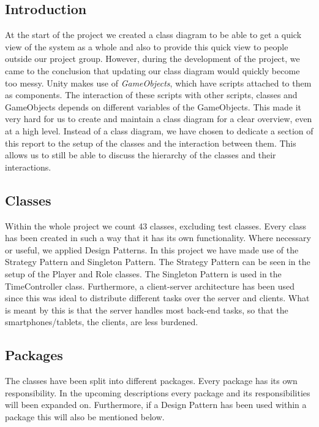\documentclass[11pt,twoside,a4paper]{article}
\begin{document}
\subsection{Introduction}
At the start of the project we created a class diagram to be able to get a quick view of the system as a whole and also to provide this quick view to people outside our project group. However, during the development of the project, we came to the conclusion that updating our class diagram would quickly become too messy. Unity makes use of \emph{GameObjects}, which have scripts attached to them as components. The interaction of these scripts with other scripts, classes and GameObjects depends on different variables of the GameObjects. This made it very hard for us to create and maintain a class diagram for a clear overview, even at a high level.
Instead of a class diagram, we have chosen to dedicate a section of this report to the setup of the classes and the interaction between them. This allows us to still be able to discuss the hierarchy of the classes and their interactions.

\subsection{Classes}
Within the whole project we count 43 classes, excluding test classes. Every class has been created in such a way that it has its own functionality. Where necessary or useful, we applied Design Patterns. In this project we have made use of the Strategy Pattern and Singleton Pattern. The Strategy Pattern can be seen in the setup of the  Player and Role classes. The Singleton Pattern is used in the TimeController class. Furthermore, a client-server architecture has been used since this was ideal to distribute different tasks over the server and clients. What is meant by this is that the server handles most back-end tasks, so that the smartphones/tablets, the clients, are less burdened.

\subsection{Packages}
The classes have been split into different packages. Every package has its own responsibility. In the upcoming descriptions every package and its responsibilities will been expanded on. Furthermore, if a Design Pattern has been used within a package this will also be mentioned below.
\end{document}
